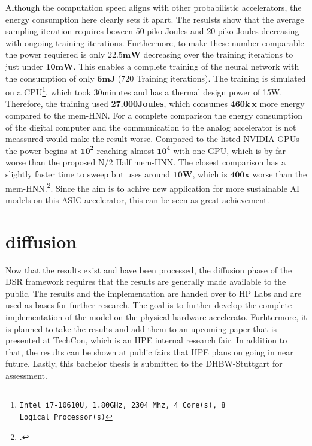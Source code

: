 Although the computation speed aligns with other probabilistic accelerators, the energy consumption here clearly sets it apart.
The resulsts show that the average sampling iteration requires beween 50 piko Joules and 20 piko Joules decreasing with ongoing training iterations.
Furthermore, to make these number comparable the power requiered is only \(\mathbf{22.5mW}\) decreasing over the training iterations to just under \(\mathbf{10mW}\).
This enables a complete training of the neural network with the consumption of only \(\mathbf{6 mJ}\) (720 Training iterations).
The training is simulated on a CPU\footnote{\texttt{Intel i7-10610U, 1.80GHz, 2304 Mhz, 4 Core(s), 8 Logical Processor(s)}}, which took 30minutes and has a thermal design power of 15W.
Therefore, the training used \textbf{27.000Joules}, which consumes \(\mathbf{460k \ x}\) more energy compared to the \ac{mem-HNN}.
For a complete comparison the energy consumption of the digital computer and the communication to the analog accelerator is not meassured 
would make the result worse. 
Compared to the listed NVIDIA \ac{GPU}s the power begins at \(\mathbf{10^2}\) reaching almost \(\mathbf{10^4}\) with one \ac{GPU},
which is by far worse than the proposed N/2 Half \ac{mem-HNN}. The closest comparison has a slightly faster time to sweep
but uses around \(\mathbf{10W}\), which is \(\mathbf{400x}\) worse than the \ac{mem-HNN}.\footcite[cf.][2]{aaditAcceleratingAdaptiveParallel2023}.
Since the aim is to achive new application for more sustainable AI models on this \ac{ASIC} accelerator, 
this can be seen as great achievement.

\section{diffusion}
Now that the results exist and have been processed, the diffusion phase of the \ac{DSR} framework 
requires that the results are generally made available to the public. 
The results and the implementation are handed over to HP Labs and are used as 
bases for further research.
The goal is to further develop the complete implementation of the model on the physical hardware accelerato.
Furhtermore, it is planned to take the results and add them to an upcoming paper that is presented
at TechCon, which is an HPE internal research fair. 
In addition to that, the results can be shown at public fairs that HPE plans on going in near future.
Lastly, this bachelor thesis is submitted to the DHBW-Stuttgart for assessment. 
